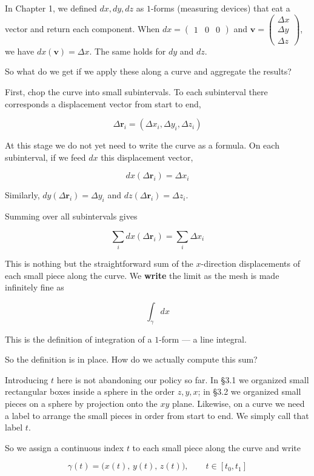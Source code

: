 \documentclass[a4paper,12pt,openany]{book}
\begin{document}
In Chapter 1, we defined \(dx, dy, dz\) as \(1\)-forms (measuring
devices) that eat a vector and return each component. When
\(dx = \begin{pmatrix}1&0&0\end{pmatrix}\) and
\(\mathbf{v} = \begin{pmatrix}\Delta x\\\Delta y\\\Delta z\end{pmatrix}\),
we have \(dx(\mathbf{v}) = \Delta x\). The same holds for \(dy\) and
\(dz\).

So what do we get if we apply these along a curve and aggregate the
results?

First, chop the curve into small subintervals. To each subinterval there
corresponds a displacement vector from start to end,

\[
\Delta\mathbf{r}_i=(\Delta x_i,\Delta y_i,\Delta z_i)
\]

At this stage we do not yet need to write the curve as a formula. On
each subinterval, if we feed \(dx\) this displacement vector,

\[dx(\Delta\mathbf{r}_i)=\Delta x_i\]

Similarly, \(dy(\Delta\mathbf{r}_i)=\Delta y_i\) and
\(dz(\Delta\mathbf{r}_i)=\Delta z_i\).

Summing over all subintervals gives

\[
\sum_i dx(\Delta\mathbf{r}_i)=\sum_i \Delta x_i
\]

This is nothing but the straightforward sum of the \(x\)-direction
displacements of each small piece along the curve. We \textbf{write} the
limit as the mesh is made infinitely fine as

\[\int_\gamma dx\]

This is the definition of integration of a \(1\)-form — a line
integral.

So the definition is in place. How do we actually compute this sum?

Introducing \(t\) here is not abandoning our policy so far. In §3.1 we
organized small rectangular boxes inside a sphere in the order
\(z,y,x\); in §3.2 we organized small pieces on a sphere by projection
onto the \(xy\) plane. Likewise, on a curve we need a label to arrange
the small pieces in order from start to end. We simply call that label
\(t\).

So we assign a continuous index \(t\) to each small piece along the
curve and write

\[\gamma(t) = \bigl(x(t),\, y(t),\, z(t)\bigr),\qquad t \in [t_0, t_1]\]
\end{document}
